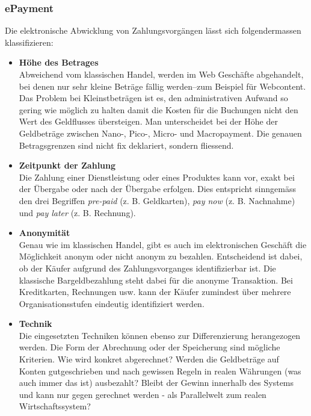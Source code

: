 \subsubsection*{ePayment}

Die elektronische Abwicklung von Zahlungsvorgängen lässt sich folgendermassen
klassifizieren:

\begin{itemize}
    \item\textbf{Höhe des Betrages} \\
    Abweichend vom klassischen Handel, werden im Web Geschäfte abgehandelt,
    bei denen nur sehr kleine Beträge fällig werden--zum Beispiel für Webcontent.
    Das Problem bei Kleinstbeträgen ist es, den administrativen Aufwand so gering
    wie möglich zu halten damit die Kosten für die Buchungen nicht den Wert des
    Geldflusses übersteigen. Man unterscheidet bei der Höhe der Geldbeträge
    zwischen Nano-, Pico-, Micro- und Macropayment. Die genauen Betragsgrenzen
    sind nicht fix deklariert, sondern fliessend.
    \item\textbf{Zeitpunkt der Zahlung} \\
    Die Zahlung einer Dienstleistung oder eines Produktes kann vor, exakt bei
    der Übergabe oder nach der Übergabe erfolgen. Dies entspricht sinngemäss
    den drei Begriffen \emph{pre-paid} (z. B. Geldkarten), \emph{pay now}
    (z. B. Nachnahme) und \emph{pay later} (z. B. Rechnung).
    \item\textbf{Anonymität} \\
    Genau wie im klassischen Handel, gibt es auch im elektronischen Geschäft
    die Möglichkeit anonym oder nicht anonym zu bezahlen. Entscheidend ist
    dabei, ob der Käufer aufgrund des Zahlungsvorganges identifizierbar ist.
    Die klassische Bargeldbezahlung steht dabei für die anonyme Transaktion.
    Bei Kreditkarten, Rechnungen usw. kann der Käufer zumindest über mehrere
    Organisationsstufen eindeutig identifiziert werden.
    \item\textbf{Technik} \\
    Die eingesetzten Techniken können ebenso zur Differenzierung herangezogen
    werden. Die Form der Abrechnung oder der Speicherung sind mögliche Kriterien.
    Wie wird konkret abgerechnet? Werden die Geldbeträge auf Konten gutgeschrieben
    und nach gewissen Regeln in realen Währungen (was auch immer das ist)
    ausbezahlt? Bleibt der Gewinn innerhalb des Systems und kann nur gegen
    gerechnet werden - als Parallelwelt zum realen Wirtschaftssystem?
\end{itemize}

